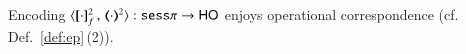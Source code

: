 \begin{comment}
		Then we have the following typing in the target language ---we write $R$ to stand for $\pmapp{P}{2}{{f,\{\rvar{X}\to \tilde{n}\}} }$
		and $\tilde{x}$ to stand for $\vmap{\ofn{P}}$.
		{\small 
		\[
		\tree{
		\tree{
		\tree{
		\tree{
		\tmap{\Gamma}{2}\cat X:\shot{\tilde{T}};\, \es;\, \tmap{\Sigma_{\tilde{n}}}{2}
		\proves
		 R  \hastype \Proc
		}{
		\tmap{\Gamma}{2}\cat X:\shot{\tilde{T}};\, \es;\, \tmap{\Sigma_{\tilde{n}}}{2}, s:\tinact 
		\proves
		 R  \hastype \Proc
		}
		}{
		\tmap{\Gamma}{2};\, \es;\, \tmap{\Sigma_{\tilde{n}}}{2}, s:\btinp{\shot{\tilde{T}}}\tinact 
		\proves
		\binp{s}{\X} R  \hastype \Proc
			} \quad 
		\tree{
		\tree{
		\tmap{\Gamma}{2};\, \es;\, \es
		\proves
		\inact \hastype \Proc
		}{
		\tmap{\Gamma}{2};\, \es;\, \dual{s}:\tinact
		\proves
		\inact \hastype \Proc
		} 
		\quad 
		\tree{
		\tree{
		\tree{
		\tmap{\Gamma}{2} \cat X: \shot{\tilde{T}};\, \es;\, \tmap{\Sigma_{\tilde{x}}}{2}
		\proves
		{{\auxmapp{R}{\mathsf{v}}{\es}}}  \hastype \Proc
		}{
		\tmap{\Gamma}{2} \cat X: \shot{\tilde{T}};\, \es;\, \tmap{\Sigma_{\tilde{x}}}{2},z: \tinact
		\proves
		{{\auxmapp{R}{\mathsf{v}}{\es}}}  \hastype \Proc
		}
		}{
		\tmap{\Gamma}{2};\, \es;\, \tmap{\Sigma_{\tilde{x}}}{2}, \, z: \btinp{A}\tinact
		\proves
		{{\binp{z}{\X} \auxmapp{R}{\mathsf{v}}{\es}}}  \hastype \Proc
		}
		}{
		\tmap{\Gamma}{2};\, \es;\, \es
		\proves
		{\abs{\tilde{x}, z } \,{\binp{z}{\X} \auxmapp{R}{\mathsf{v}}{\es}}}  \hastype \shot{\tilde{T}}
		}	
		}{
			\tmap{\Gamma}{2};\, \es;\, \dual{s}:\btout{\shot{\tilde{T}}}\tinact
		\proves
		\bbout{\dual{s}}{\abs{\tilde{x}, z } \,{\binp{z}{\X} \auxmapp{R}{\mathsf{v}}{\es}}} \inact \hastype \Proc
		}
		}{
		\tmap{\Gamma}{2};\, \es;\, \tmap{\Sigma_{\tilde{n}}}{2}, s:\btinp{\shot{\tilde{T}}}\tinact , \dual{s}:\btout{\shot{\tilde{T}}}\tinact
		\proves
		\binp{s}{\X} R \Par \bbout{\dual{s}}{\abs{\tilde{x}, z } \,{\binp{z}{\X} \auxmapp{R}{\mathsf{v}}{\es}}} \inact \hastype \Proc
		}
		}{
		\tmap{\Gamma}{2};\, \es;\, \tmap{\Sigma_{\tilde{n}}}{2} 
		\proves
		\newsp{s}{\binp{s}{\X} R \Par \bbout{\dual{s}}{\abs{\tilde{x}, z } \,{\binp{z}{\X} \auxmapp{R}{\mathsf{v}}{\es}}} \inact} \hastype \Proc
		}
		\]
		}
	\end{enumerate}
\qed
\end{proof}
\end{comment}

\begin{proposition}\rm
	Encoding $\fencod{\cdot}{\cdot}{2}{f}: \sesp \to \HO$ 
	enjoys operational correspondence (cf. Def.~\ref{def:ep}\,(2)).
\end{proposition}

